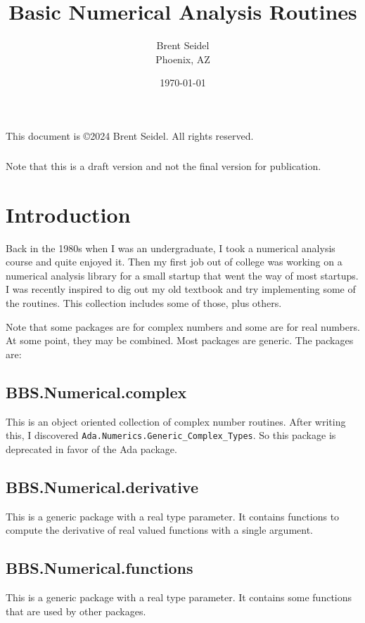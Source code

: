 \documentclass[10pt, openany]{book}
\title{Basic Numerical Analysis Routines}
\author{Brent Seidel \\ Phoenix, AZ}
\date{ \today }
\newcommand{\package}[1]{\texttt{#1}}
\begin{document}
%
%
\frontmatter
\maketitle
\begin{center}
This document is \copyright 2024 Brent Seidel.  All rights reserved.

\paragraph{}Note that this is a draft version and not the final version for publication.
\end{center}
\tableofcontents

\mainmatter
\chapter{Introduction}

Back in the 1980s when I was an undergraduate, I took a numerical analysis course and quite enjoyed it.  Then my first job out of college was working on a numerical analysis library for a small startup that went the way of most startups.  I was recently inspired to dig out my old textbook and try implementing some of the routines.  This collection includes some of those, plus others.

Note that some packages are for complex numbers and some are for real numbers.  At some point, they may be combined.  Most packages are generic.  The packages are:

\section{BBS.Numerical.complex}
This is an object oriented collection of complex number routines.  After writing this, I discovered \package{Ada.Numerics.Generic\_Complex\_Types}.  So this package is deprecated in favor of the Ada package.

\section{BBS.Numerical.derivative}
This is a generic package with a real type parameter.  It contains functions to compute the derivative of real valued functions with a single argument.

\section{BBS.Numerical.functions}
This is a generic package with a real type parameter.  It contains some functions that are used by other packages.
\end{document}
